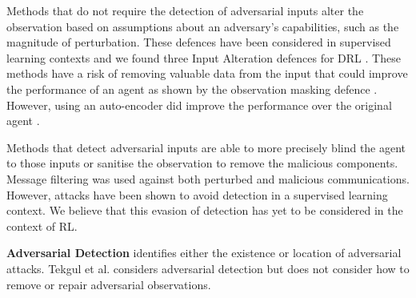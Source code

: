 \documentclass[conference,compsoc]{IEEEtran}
\begin{document}
Methods that do not require the detection of adversarial inputs alter the observation based on assumptions about an adversary's capabilities, such as the magnitude of perturbation. These defences have been considered in supervised learning contexts \cite{guo_countering_2018} and we found three Input Alteration defences for DRL \cite{ohashi_deep_2021,guo_edge_2021,gleave_adversarial_2020}. These methods have a risk of removing valuable data from the input that could improve the performance of an agent as shown by the observation masking defence \cite{gleave_adversarial_2020}. However, using an auto-encoder did improve the performance over the original agent \cite{ohashi_deep_2021}.

Methods that detect adversarial inputs are able to more precisely blind the agent to those inputs or sanitise the observation to remove the malicious components. Message filtering was used against both perturbed \cite{xue_mis-spoke_2022} and malicious communications\cite{mitchell_gaussian_2020}. However, attacks have been shown to avoid detection \cite{carlini_adversarial_2017} in a supervised learning context. We believe that this evasion of detection has yet to be considered in the context of RL.


\noindent \textbf{Adversarial Detection}
identifies either the existence or location of adversarial attacks. Tekgul et al. \cite{tekgul_real-time_2022} considers adversarial detection but does not consider how to remove or repair adversarial observations.
\end{document}
